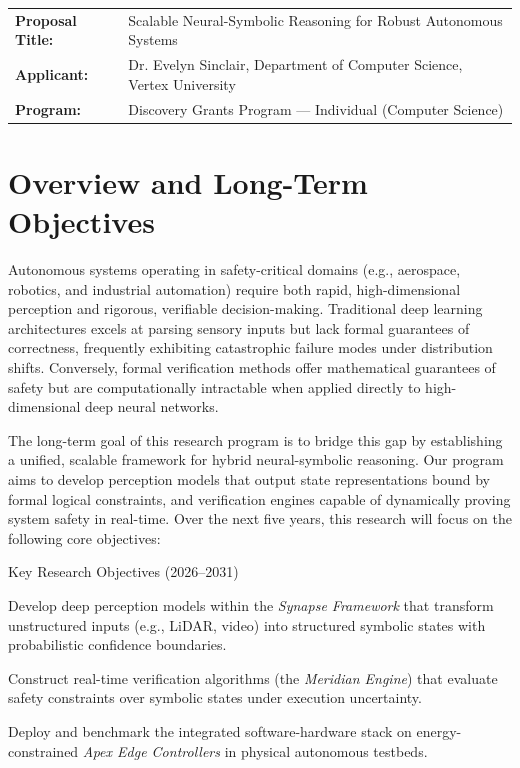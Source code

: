 \documentclass[12pt, letterpaper]{article}
\begin{document}
\begin{tcolorbox}[colback=nsercnavy, colframe=nsercnavy, arc=4pt, left=12pt, right=12pt, top=10pt, bottom=10pt]
  \color{white}
  \noindent
  \begin{tabularx}{\textwidth}{l X}
    \textbf{Proposal Title:} & Scalable Neural-Symbolic Reasoning for Robust Autonomous Systems \\
    \textbf{Applicant:} & Dr. Evelyn Sinclair, Department of Computer Science, Vertex University \\
    \textbf{Program:} & Discovery Grants Program --- Individual (Computer Science) \\
  \end{tabularx}
\end{tcolorbox}

\section{Overview and Long-Term Objectives}
Autonomous systems operating in safety-critical domains (e.g., aerospace, robotics, and industrial automation) require both rapid, high-dimensional perception and rigorous, verifiable decision-making. Traditional deep learning architectures excels at parsing sensory inputs but lack formal guarantees of correctness, frequently exhibiting catastrophic failure modes under distribution shifts. Conversely, formal verification methods offer mathematical guarantees of safety but are computationally intractable when applied directly to high-dimensional deep neural networks.

The long-term goal of this research program is to bridge this gap by establishing a unified, scalable framework for hybrid neural-symbolic reasoning. Our program aims to develop perception models that output state representations bound by formal logical constraints, and verification engines capable of dynamically proving system safety in real-time. Over the next five years, this research will focus on the following core objectives:

\begin{objectivebox}{Key Research Objectives (2026--2031)}
  \begin{description}[leftmargin=1.2em, labelsep=0.5em, itemsep=4pt]
    \item[\textbf{Objective 1: Neural-Symbolic Perception.}] Develop deep perception models within the \emph{Synapse Framework} that transform unstructured inputs (e.g., LiDAR, video) into structured symbolic states with probabilistic confidence boundaries.
    \item[\textbf{Objective 2: Dynamic Formal Verification.}] Construct real-time verification algorithms (the \emph{Meridian Engine}) that evaluate safety constraints over symbolic states under execution uncertainty.
    \item[\textbf{Objective 3: Edge Hardware Validation.}] Deploy and benchmark the integrated software-hardware stack on energy-constrained \emph{Apex Edge Controllers} in physical autonomous testbeds.
  \end{description}
\end{objectivebox}
\end{document}
